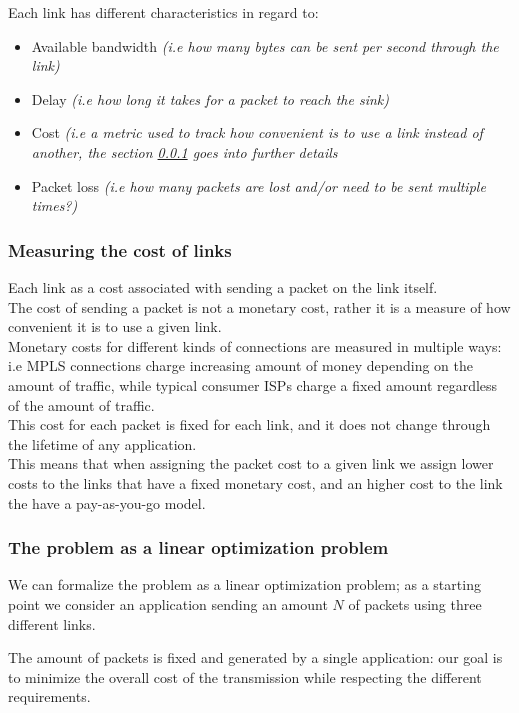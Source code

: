 Each link has different characteristics in regard to:
\begin{itemize}
	\item Available bandwidth \textit{(i.e how many bytes can be sent per second through the link)}
	\item Delay \textit{(i.e how long it takes for a packet to reach the sink)}
	\item Cost \textit{(i.e a metric used to track how convenient is to use a link instead of another, the section \ref{link_cost} goes into further details}
	\item Packet loss \textit{(i.e how many packets are lost and/or need to be sent multiple times?)}
\end{itemize} 



\subsubsection{Measuring the cost of links} \label{link_cost}
Each link as a cost associated with sending a packet on the link itself. \\
The cost of sending a packet is not a monetary cost, rather it is a measure of how convenient it is to use a given link. \\
Monetary costs for different kinds of connections are measured in multiple ways: i.e   MPLS connections charge increasing amount of money depending on the amount of traffic, while typical consumer ISPs charge a fixed amount regardless of the amount of traffic. \\
This cost for each packet is fixed for each link, and it does not change through the lifetime of any application. \\
This means that when assigning the packet cost to a given link we assign lower costs to the links that have a fixed monetary cost, and an higher cost to the link the have a pay-as-you-go model.


	
	\subsubsection{The problem as a linear optimization problem}  \label{linear_optimizaion_problem}
	
	We can formalize the problem as a linear optimization problem;
	as a starting point we consider an application sending an amount $N$ of packets using three different links.
	
	The amount of packets is fixed and generated by a single application: our goal is to minimize the overall cost of the transmission while respecting the different requirements.
	
